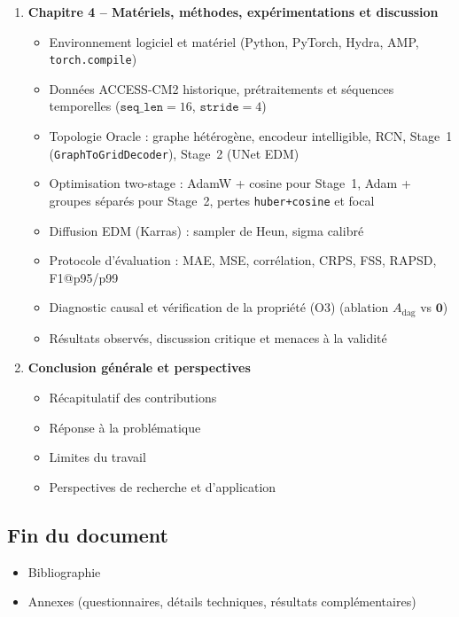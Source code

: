\documentclass[12pt,a4paper]{article}
\begin{document}
\begin{enumerate}
    \item \textbf{Chapitre 4 -- Mat\'eriels, m\'ethodes, exp\'erimentations et discussion}
    \begin{itemize}
        \item Environnement logiciel et mat\'eriel (Python, PyTorch, Hydra, AMP, \texttt{torch.compile})
        \item Donn\'ees ACCESS-CM2 historique, pr\'etraitements et s\'equences temporelles ($\texttt{seq\_len}=16$, $\texttt{stride}=4$)
        \item Topologie Oracle : graphe h\'et\'erog\`ene, encodeur intelligible, RCN, Stage~1 (\texttt{GraphToGridDecoder}), Stage~2 (UNet EDM)
        \item Optimisation two-stage : AdamW + cosine pour Stage~1, Adam + groupes s\'epar\'es pour Stage~2, pertes \texttt{huber+cosine} et focal
        \item Diffusion EDM (Karras) : sampler de Heun, sigma calibr\'e
        \item Protocole d'\'evaluation : MAE, MSE, corr\'elation, CRPS, FSS, RAPSD, F1@p95/p99
        \item Diagnostic causal et v\'erification de la propri\'et\'e (O3) (ablation $A_{\text{dag}}$ vs $\mathbf{0}$)
        \item R\'esultats observ\'es, discussion critique et menaces \`a la validit\'e
    \end{itemize}

    \item \textbf{Conclusion g\'en\'erale et perspectives}
    \begin{itemize}
        \item R\'ecapitulatif des contributions
        \item R\'eponse \`a la probl\'ematique
        \item Limites du travail
        \item Perspectives de recherche et d'application
    \end{itemize}
\end{enumerate}

\subsection*{Fin du document}
\begin{itemize}
    \item Bibliographie
    \item Annexes (questionnaires, d\'etails techniques, r\'esultats compl\'ementaires)
\end{itemize}
\end{document}

